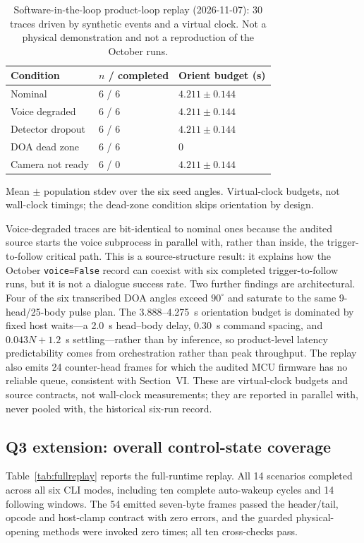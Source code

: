 \documentclass[conference]{IEEEtran}
\newcommand{\code}[1]{\texttt{#1}}
\begin{document}
\begin{table}[t]
\centering
\caption{Software-in-the-loop product-loop replay (2026-11-07): 30 traces driven by synthetic events and a virtual clock. Not a physical demonstration and not a reproduction of the October runs.}
\label{tab:replay}
\footnotesize
\begin{tabularx}{\columnwidth}{@{}p{30mm}YY@{}}
\toprule
Condition & $n$ / completed & Orient budget (s)\\
\midrule
Nominal & 6 / 6 & $4.211\pm0.144$\\
Voice degraded & 6 / 6 & $4.211\pm0.144$\\
Detector dropout & 6 / 6 & $4.211\pm0.144$\\
DOA dead zone & 6 / 6 & 0\\
Camera not ready & 6 / 0 & $4.211\pm0.144$\\
\bottomrule
\end{tabularx}
\vspace{2pt}
\begin{flushleft}
\footnotesize Mean $\pm$ population stdev over the six seed angles. Virtual-clock budgets, not wall-clock timings; the dead-zone condition skips orientation by design.
\end{flushleft}
\end{table}

Voice-degraded traces are bit-identical to nominal ones because the audited source starts the voice subprocess in parallel with, rather than inside, the trigger-to-follow critical path. This is a source-structure result: it explains how the October \code{voice=False} record can coexist with six completed trigger-to-follow runs, but it is not a dialogue success rate. Two further findings are architectural. Four of the six transcribed DOA angles exceed $90^\circ$ and saturate to the same 9-head/25-body pulse plan. The 3.888--4.275~s orientation budget is dominated by fixed host waits---a 2.0~s head--body delay, 0.30~s command spacing, and $0.043N+1.2$~s settling---rather than by inference, so product-level latency predictability comes from orchestration rather than peak throughput. The replay also emits 24 counter-head frames for which the audited MCU firmware has no reliable queue, consistent with Section~VI. These are virtual-clock budgets and source contracts, not wall-clock measurements; they are reported in parallel with, never pooled with, the historical six-run record.

\subsection{Q3 extension: overall control-state coverage}
Table~\ref{tab:fullreplay} reports the full-runtime replay. All 14 scenarios completed across all six CLI modes, including ten complete auto-wakeup cycles and 14 following windows. The 54 emitted seven-byte frames passed the header/tail, opcode and host-clamp contract with zero errors, and the guarded physical-opening methods were invoked zero times; all ten cross-checks pass.
\end{document}

